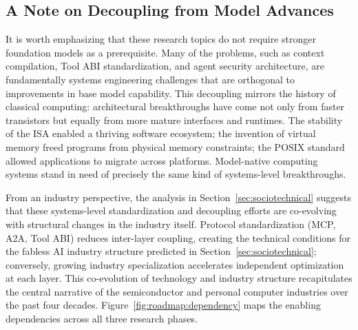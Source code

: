 \subsection{A Note on Decoupling from Model Advances}

It is worth emphasizing that these research topics do not require stronger foundation models as a prerequisite.
Many of the problems, such as context compilation, Tool ABI standardization, and agent security architecture, are fundamentally systems engineering challenges that are orthogonal to improvements in base model capability.
This decoupling mirrors the history of classical computing: architectural breakthroughs have come not only from faster transistors but equally from more mature interfaces and runtimes.
The stability of the ISA enabled a thriving software ecosystem; the invention of virtual memory freed programs from physical memory constraints; the POSIX standard allowed applications to migrate across platforms.
Model-native computing systems stand in need of precisely the same kind of systems-level breakthroughs.

From an industry perspective, the analysis in Section~\ref{sec:sociotechnical} suggests that these systems-level standardization and decoupling efforts are co-evolving with structural changes in the industry itself.
Protocol standardization (MCP, A2A, Tool ABI) reduces inter-layer coupling, creating the technical conditions for the fabless AI industry structure predicted in Section~\ref{sec:sociotechnical}; conversely, growing industry specialization accelerates independent optimization at each layer.
This co-evolution of technology and industry structure recapitulates the central narrative of the semiconductor and personal computer industries over the past four decades.
Figure~\ref{fig:roadmap:dependency} maps the enabling dependencies across all three research phases.

